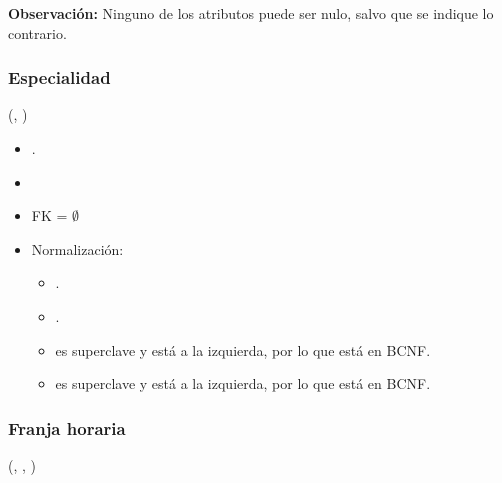 \textbf{Observación:} Ninguno de los atributos puede ser nulo, salvo que se 
indique lo contrario.

\subsubsection{Especialidad}

    (, )

    \begin{itemize}
        \item {}.
        \item {}
        \item FK = $\emptyset$

        \item Normalización:
            
            \begin{itemize}
                \item {}.
                \item {}.
                    
                \item {} es superclave y está a la izquierda, por lo
                    que está en BCNF.
                \item {} es superclave y está a la izquierda, por lo
                    que está en BCNF.
            \end{itemize}
    \end{itemize}

\subsubsection{Franja horaria}

    (, , )

